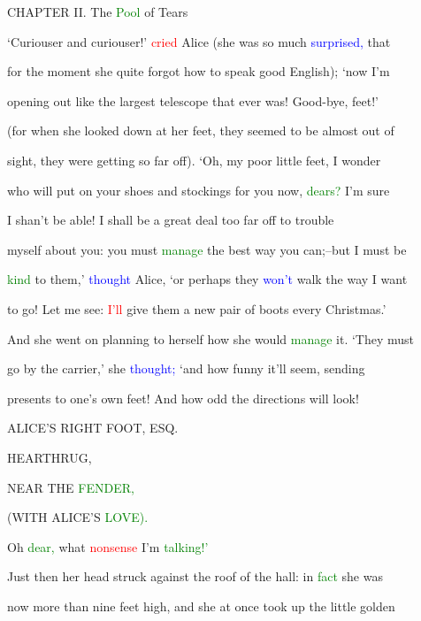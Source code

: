  CHAPTER II. The \textcolor{green}{Pool} of Tears



 ‘Curiouser and curiouser!’ \textcolor{red}{cried} Alice (she was so much \textcolor{blue}{surprised,} that

 for the moment she quite forgot how to speak \textcolor{BurntOrange}{good} English); ‘now I’m

 opening out like the largest telescope that ever was! Good-bye, feet!’

 (for when she looked down at her feet, they seemed to be almost out of

 sight, they were getting so far off). ‘Oh, my poor little feet, I wonder

 who will put on your shoes and stockings for you now, \textcolor{green}{dears?} I’m sure

 I shan’t be able! I shall be a great \textcolor{BurntOrange}{deal} too far off to trouble

 myself about you: you must \textcolor{green}{manage} the best way you can;--but I must be

 \textcolor{green}{kind} to them,’ \textcolor{blue}{thought} Alice, ‘or perhaps they \textcolor{blue}{won’t} walk the way I want

 to go! Let me see: \textcolor{red}{I’ll} give them a new pair of boots every Christmas.’



 And she went on \textcolor{BurntOrange}{planning} to herself how she would \textcolor{green}{manage} it. ‘They must

 go by the carrier,’ she \textcolor{blue}{thought;} ‘and how funny it’ll seem, sending

 \textcolor{BurntOrange}{presents} to one’s own feet! And how odd the directions will look!



 ALICE’S RIGHT FOOT, ESQ.

 HEARTHRUG,

 NEAR THE \textcolor{green}{FENDER,}

 (WITH ALICE’S \textcolor{green}{LOVE).}



 Oh \textcolor{green}{dear,} what \textcolor{red}{nonsense} I’m \textcolor{green}{talking!’}



 Just then her head struck against the roof of the hall: in \textcolor{green}{fact} she was

 now more than nine feet high, and she at once took up the little golden

